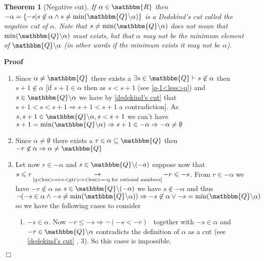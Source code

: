 \documentclass{book}
\newcommand{\Rightarrowlim}{\mathop{\rightarrow}\limits}
\newcommand{\nin}{\not\in}
\newcommand{\nobracket}{}
\newcommand{\um}{-}
\newcommand{\upl}{+}
\newenvironment{proof}{\noindent\textbf{Proof\ }}{\hspace*{\fill}$\Box$\medskip}
\newtheorem{theorem}{Theorem}
\begin{document}
{{\begin{theorem}[Negative cut]
  \label{negative cut}{}If $\alpha \in \mathbbm{R}$ then
  $- \alpha = \{ - s | s \nin \alpha \wedge s \neq \min (\mathbbm{Q}
  \backslash \alpha) \nobracket \}$ is a Dedekind's cut called the negative
  cut of $\alpha$. Note that $s \neq \min (\mathbbm{Q} \backslash \alpha)$
  does not mean that $\min (\mathbbm{Q} \backslash \alpha)$ must exists, but
  that $\alpha$ may not be the minimum element of $\mathbbm{Q} \backslash
  \alpha$ (in other words if the minimum exists it may not be $\alpha$).
\end{theorem}

\begin{proof}
  
  \begin{enumerate}
    \item Since $\alpha \neq \mathbbm{Q}$ there exists a $\exists s \in
    \mathbbm{Q} \vdash s \nin \alpha$ then $s \upl 1 \nin \alpha$ [if $s \upl
    1 \in \alpha$ then as $s < s \upl 1$ (see \ref{q-1<less>q}) and $s \in
    \mathbbm{Q} \backslash \alpha$ we have by \ref{dedekind's cut} that $s
    \upl 1 < s < s \upl 1 \Rightarrow s + 1 < s + 1$ a contradiction]. As $s,
    s + 1 \in \mathbbm{Q} \backslash \alpha, s < s + 1$ we can't have $s \upl
    1 = \min (\mathbbm{Q} \backslash \alpha) \Rightarrow s + 1 \in - \alpha
    \Rightarrow \um \alpha \neq \emptyset$
    
    \item Since $\alpha \neq \emptyset$ there exists a $r \in \alpha \subseteq
    \mathbbm{Q}$ then $- r \nin \alpha \Rightarrow \alpha \neq \mathbbm{Q}$
    
    \item Let now $r \in - \alpha$ and $s \in \mathbbm{Q} \backslash (\um a)$
    suppose now that $s \leqslant r
    \Rightarrowlim_{\text{\ref{q<less>=r=<gtr>-r<less>=-q for rational
    numbers}}} \um r \leqslant \um s$. From $r \in \um \alpha$ we have $\um r
    \nin \alpha$ as $s \in \mathbbm{Q} \backslash (- \alpha)$ we have $s \nin
    \um \alpha$ and thus $\neg (- s \in \alpha \wedge - s \neq \min
    (\mathbbm{Q} \backslash \alpha)) \Rightarrow - s \nin \alpha \vee - s =
    \min (\mathbbm{Q} \backslash \alpha)$ so we have the following cases to
    consider
    \begin{enumerate}
      \item $- s \in \alpha$. Now $- r \leqslant - s \Rightarrow \neg (- s < -
      r)$ \ together with $- s \in \alpha$ and $- r \in \mathbbm{Q} \backslash
      \alpha$ contradicts the definition of $\alpha$ as a cut (see
      \ref{dedekind's cut} , 3). So this cases is impossible.
      

\end{enumerate}
\end{enumerate}
\end{proof}}}
\end{document}
